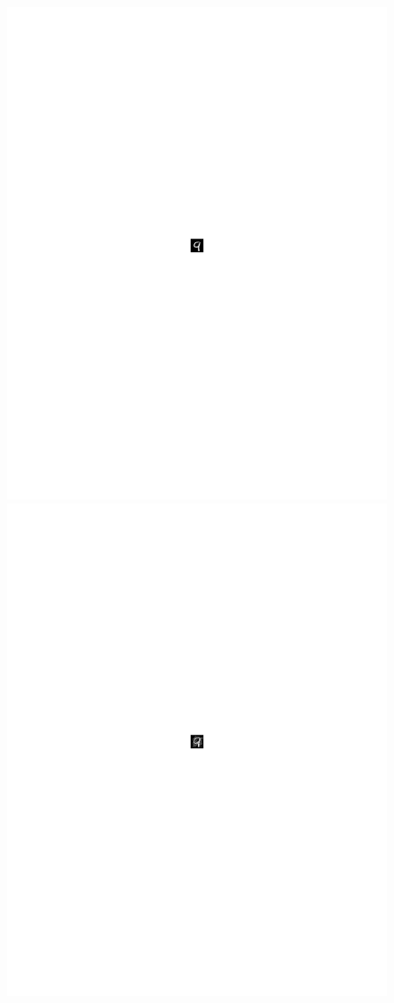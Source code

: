 \begin{figure}[b]
\centering
\begin{minipage}{.09\textwidth}
	\centering
    \includegraphics[width =0.9\linewidth, trim = 300 400 300 375, clip]{figs/orig9.pdf}
\end{minipage}%
\begin{minipage}{.09\textwidth}
	\centering
\includegraphics[width =0.9\linewidth, trim = 300 400 300 375, clip]{figs/goodfellow9.pdf}

\end{minipage}
\end{figure}
